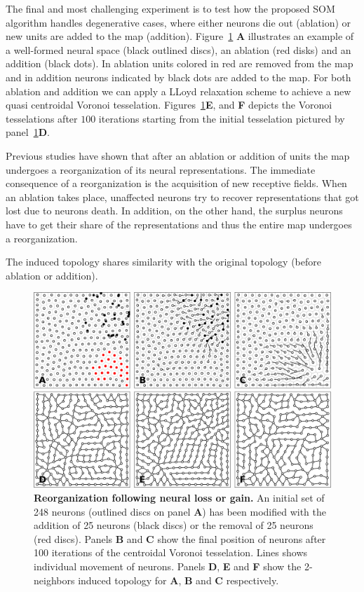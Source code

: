 The final and most challenging experiment is to test how the proposed SOM
algorithm handles degenerative cases, where either neurons
die out (ablation) or new units are added to the map (addition). 
Figure~\ref{fig:CVT} {\bfseries \sffamily A} illustrates an example of a
well-formed neural space (black outlined discs), an ablation
(red disks) and an addition (black dots). In ablation units colored in red are
removed from the map and in addition neurons indicated by black dots are
added to the map. 
For both ablation and addition we can apply a LLoyd relaxation scheme to 
achieve a new quasi centroidal Voronoi tesselation. Figures~\ref{fig:CVT}{\bfseries \sffamily E},
and {\bfseries \sffamily F} depicts the Voronoi tesselations after $100$ 
iterations starting from the initial tesselation pictured by 
panel~\ref{fig:CVT}{\bfseries \sffamily D}. 

Previous studies have shown that after an ablation or addition of units the
map undergoes a reorganization of its neural representations. The immediate 
consequence of a reorganization is the acquisition of new receptive fields. 
When an ablation takes place, unaffected neurons try to recover representations
that got lost due to neurons death. In addition, on the other hand, the surplus
neurons have to get their share of the representations and thus the entire map
undergoes a reorganization.

The induced topology shares similarity with the original
topology (before ablation or addition).

\begin{figure}
  \includegraphics[width=\columnwidth]{figures/vsom-resilience.pdf}
  \caption{\textbf{Reorganization following neural loss or gain.}  An initial
    set of 248 neurons (outlined discs on panel \textbf{A}) has been modified
    with the addition of 25 neurons (black discs) or the removal of 25 neurons
    (red discs). Panels \textbf{B} and \textbf{C} show the final position of
    neurons after 100 iterations of the centroidal Voronoi tesselation. Lines
    shows individual movement of neurons. Panels \textbf{D}, \textbf{E} and
    \textbf{F} show the 2-neighbors induced topology for \textbf{A},
    \textbf{B} and \textbf{C} respectively.}
  \label{fig:CVT}
\end{figure}

